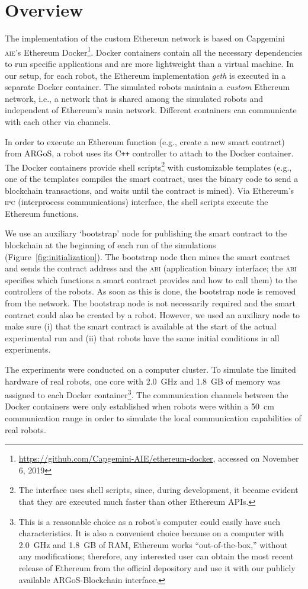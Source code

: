 \documentclass{article}
\begin{document}
\section{Overview}

The implementation of the custom Ethereum network is based on
Capgemini \textsc{aie}'s Ethereum
Docker\footnote{\url{https://github.com/Capgemini-AIE/ethereum-docker},
  accessed on November 6, 2019}. Docker containers
\citep{Mer2014:linux} contain all the necessary dependencies to run
specific applications and are more lightweight than a virtual
machine. In our setup, for each robot, the Ethereum implementation
\emph{geth} is executed in a separate Docker container. The simulated
robots maintain a \emph{custom} Ethereum network, i.e., a network that
is shared among the simulated robots and independent of Ethereum's
main network. Different containers can communicate with each other via
channels.

In order to execute an Ethereum function (e.g., create a new smart
contract) from ARGoS, a robot uses its C\texttt{++} controller to
attach to the Docker container. The Docker containers provide shell
scripts\footnote{The interface uses shell scripts, since, during
  development, it became evident that they are executed much faster
  than other Ethereum APIs.} with customizable templates (e.g., one of
the templates compiles the smart contract, uses the binary code to
send a blockchain transactions, and waits until the contract is
mined). Via Ethereum's \textsc{ipc} (interprocess communications)
interface, the shell scripts execute the Ethereum functions.

We use an auxiliary `bootstrap' node for publishing the smart contract
to the blockchain at the beginning of each run of the simulations
(Figure~\ref{fig:initialization}). The bootstrap node then mines the
smart contract and sends the contract address and the \textsc{abi}
(application binary interface; the \textsc{abi} specifies which
functions a smart contract provides and how to call them) to the
controllers of the robots. As soon as this is done, the bootstrap node
is removed from the network. The bootstrap node is not necessarily
required and the smart contract could also be created by a
robot. However, we used an auxiliary node to make sure (i) that the
smart contract is available at the start of the actual experimental
run and (ii) that robots have the same initial conditions in all
experiments.

The experiments were conducted on a computer cluster. To simulate the
limited hardware of real robots, one core with 2.0~GHz and 1.8~GB of
memory was assigned to each Docker container\footnote{This is a
  reasonable choice as a robot's computer could easily have such
  characteristics. It is also a convenient choice because on a
  computer with 2.0~GHz and 1.8~GB of RAM, Ethereum works
  ``out-of-the-box,'' without any modifications; therefore, any
  interested user can obtain the most recent release of Ethereum from
  the official depository and use it with our publicly available
  ARGoS-Blockchain interface.}. The communication channels between the
Docker containers were only established when robots were within a
50~cm communication range in order to simulate the local communication
capabilities of real robots.
\end{document}
